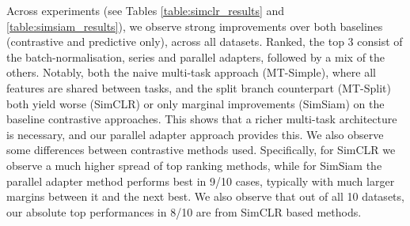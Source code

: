 \documentclass{INTERSPEECH2023}
\begin{document}
 Across experiments (see Tables \ref{table:simclr_results} and \ref{table:simsiam_results}), we observe strong improvements over both baselines (contrastive and predictive only), across all datasets. Ranked, the top 3 consist of the batch-normalisation, series and parallel adapters, followed by a mix of the others. Notably, both the naive multi-task approach (MT-Simple), where all features are shared between tasks, and the split branch counterpart (MT-Split) both yield worse (SimCLR) or only marginal improvements (SimSiam) on the baseline contrastive approaches. This shows that a richer multi-task architecture is necessary, and our parallel adapter approach provides this. We also observe some differences between contrastive methods used. Specifically, for SimCLR we observe a much higher spread of top ranking methods, while for SimSiam the parallel adapter method performs best in 9/10 cases, typically with much larger margins between it and the next best. We also observe that out of all 10 datasets, our absolute top performances in 8/10 are from SimCLR based methods.
\end{document}

